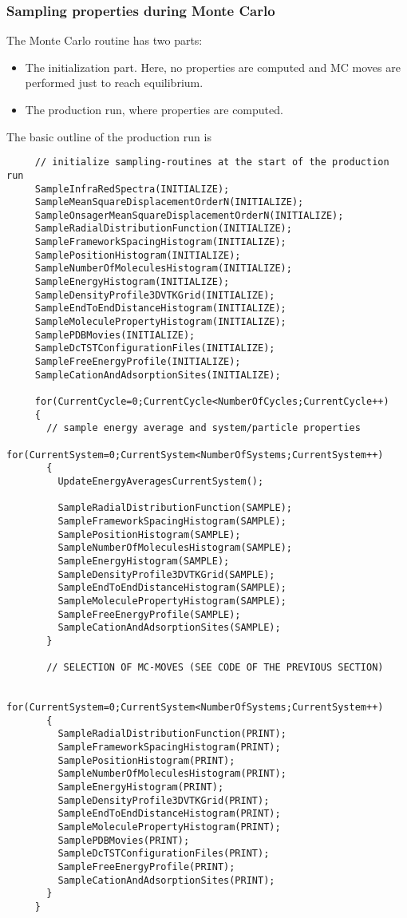 \subsubsection*{Sampling properties during Monte Carlo}
The Monte Carlo routine has two parts:
\begin{itemize}
  \item{The initialization part. Here, no properties are computed and MC moves are performed just to reach equilibrium.}
  \item{The production run, where properties are computed.}
\end{itemize}
The basic outline of the production run is
\begin{footnotesize}
\begin{verbatim}
     // initialize sampling-routines at the start of the production run
     SampleInfraRedSpectra(INITIALIZE);
     SampleMeanSquareDisplacementOrderN(INITIALIZE);
     SampleOnsagerMeanSquareDisplacementOrderN(INITIALIZE);
     SampleRadialDistributionFunction(INITIALIZE);
     SampleFrameworkSpacingHistogram(INITIALIZE);
     SamplePositionHistogram(INITIALIZE);
     SampleNumberOfMoleculesHistogram(INITIALIZE);
     SampleEnergyHistogram(INITIALIZE);
     SampleDensityProfile3DVTKGrid(INITIALIZE);
     SampleEndToEndDistanceHistogram(INITIALIZE);
     SampleMoleculePropertyHistogram(INITIALIZE);
     SamplePDBMovies(INITIALIZE);
     SampleDcTSTConfigurationFiles(INITIALIZE);
     SampleFreeEnergyProfile(INITIALIZE);
     SampleCationAndAdsorptionSites(INITIALIZE);

     for(CurrentCycle=0;CurrentCycle<NumberOfCycles;CurrentCycle++)
     {
       // sample energy average and system/particle properties
       for(CurrentSystem=0;CurrentSystem<NumberOfSystems;CurrentSystem++)
       {
         UpdateEnergyAveragesCurrentSystem();

         SampleRadialDistributionFunction(SAMPLE);
         SampleFrameworkSpacingHistogram(SAMPLE);
         SamplePositionHistogram(SAMPLE);
         SampleNumberOfMoleculesHistogram(SAMPLE);
         SampleEnergyHistogram(SAMPLE);
         SampleDensityProfile3DVTKGrid(SAMPLE);
         SampleEndToEndDistanceHistogram(SAMPLE);
         SampleMoleculePropertyHistogram(SAMPLE);
         SampleFreeEnergyProfile(SAMPLE);
         SampleCationAndAdsorptionSites(SAMPLE);
       }

       // SELECTION OF MC-MOVES (SEE CODE OF THE PREVIOUS SECTION)

       for(CurrentSystem=0;CurrentSystem<NumberOfSystems;CurrentSystem++)
       {
         SampleRadialDistributionFunction(PRINT);
         SampleFrameworkSpacingHistogram(PRINT);
         SamplePositionHistogram(PRINT);
         SampleNumberOfMoleculesHistogram(PRINT);
         SampleEnergyHistogram(PRINT);
         SampleDensityProfile3DVTKGrid(PRINT);
         SampleEndToEndDistanceHistogram(PRINT);
         SampleMoleculePropertyHistogram(PRINT);
         SamplePDBMovies(PRINT);
         SampleDcTSTConfigurationFiles(PRINT);
         SampleFreeEnergyProfile(PRINT);
         SampleCationAndAdsorptionSites(PRINT);
       }
     }


\end{verbatim}
\end{footnotesize}
